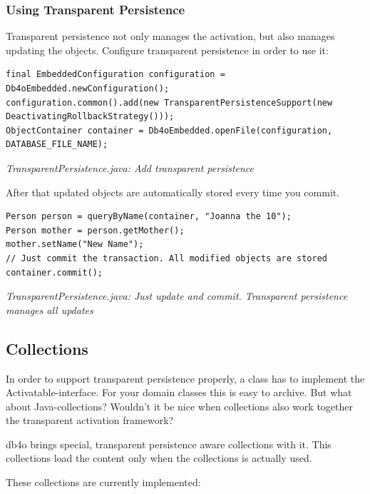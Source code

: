 \subsubsection*{Using Transparent Persistence}

Transparent persistence not only manages the activation, but also manages updating the objects. Configure transparent persistence in order to use it:

\begin{lstlisting}
final EmbeddedConfiguration configuration = Db4oEmbedded.newConfiguration();
configuration.common().add(new TransparentPersistenceSupport(new DeactivatingRollbackStrategy()));
ObjectContainer container = Db4oEmbedded.openFile(configuration, DATABASE_FILE_NAME);
\end{lstlisting}

{\small\itshape TransparentPersistence.java: Add transparent persistence\par}
\medskip

After that updated objects are automatically stored every time you commit.

\begin{lstlisting}
Person person = queryByName(container, "Joanna the 10");
Person mother = person.getMother();
mother.setName("New Name");
// Just commit the transaction. All modified objects are stored
container.commit();
\end{lstlisting}

{\small\itshape TransparentPersistence.java: Just update and commit. Transparent persistence manages all updates\par}
\medskip

\subsection{Collections}
\label{ref:basics-transparentpersistence-collections}

In order to support transparent persistence properly, a class has to implement the Activatable-interface. For your domain classes this is easy to archive. But what about Java-collections? Wouldn't it be nice when collections also work together the transparent activation framework?

db4o brings special, transparent persistence aware collections with it. This collections load the content only when the collections is actually used.

These collections are currently implemented:

